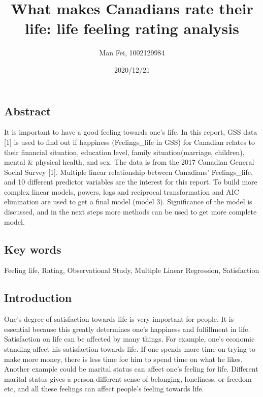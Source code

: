 \documentclass[
]{article}
\title{What makes Canadians rate their life: life feeling rating analysis}
\author{Man Fei, 1002129984}
\date{2020/12/21}
\begin{document}
\maketitle

\hypertarget{abstract}{%
\subsection{Abstract}\label{abstract}}

It is important to have a good feeling towards one's life. In this
report, GSS data {[}1{]} is used to find out if happiness
(Feelings\_life in GSS) for Canadian relates to their financial
situation, education level, family situation(marriage, children), mental
\& physical health, and sex. The data is from the 2017 Canadian General
Social Survey {[}1{]}. Multiple linear relationship between Canadians'
Feelings\_life, and 10 different predictor variables are the interest
for this report. To build more complex linear models, powers, logs and
reciprocal transformation and AIC elimination are used to get a final
model (model 3). Significance of the model is discussed, and in the next
steps more methods can be used to get more complete model.

\hypertarget{key-words}{%
\subsection{Key words}\label{key-words}}

Feeling life, Rating, Observational Study, Multiple Linear Regression,
Satisfaction

\hypertarget{introduction}{%
\subsection{Introduction}\label{introduction}}

One's degree of satisfaction towards life is very important for people.
It is essential because this greatly determines one's happiness and
fulfillment in life. Satisfaction on life can be affected by many
things. For example, one's economic standing affect his satisfaction
towards life. If one spends more time on trying to make more money,
there is less time foe him to spend time on what he likes. Another
example could be marital status can affect one's feeling for life.
Different marital status gives a person different sense of belonging,
loneliness, or freedom etc, and all these feelings can affect people's
feeling towards life.\\
\end{document}
